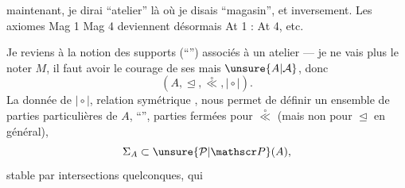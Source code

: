  maintenant, je dirai ``atelier'' là où je disais ``magasin'', et inversement. Les axiomes Mag 1  Mag 4 deviennent désormais At 1 : At 4, etc.

Je reviens à la notion des supports (``'') associés à un atelier --- je ne vais plus le noter $M$, il faut avoir le courage de ses  mais $\unsure{A|\mathcal A}$, donc
\[
(A,\trianglelefteq,\overset{\circ}{\ll},\mathrel{\mid\circ\mid}).
\]
La donnée de $\mathrel{\mid\circ\mid}$, relation symétrique , nous permet de définir un ensemble de parties particulières de $A$,  ``'', parties fermées pour $\overset{\circ}{\ll}$ (mais non pour $\trianglelefteq$ en général), 
\[
\Sigma_A\subset\unsure{\mathcal P|\mathscr P}(A),
\]
stable par intersections quelconques, qui
